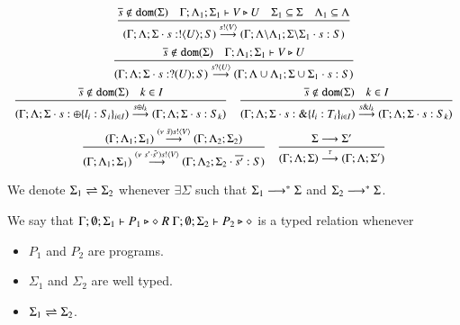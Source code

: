 \[
\begin{array}{c}
	\tree{
		\dual{s} \notin \dom{\Sigma} \quad \Gamma; \Lambda_1; \Sigma_1 \proves V \hastype U \quad \Sigma_1 \subseteq \Sigma \quad \Lambda_1 \subseteq \Lambda
	}{
		(\Gamma; \Lambda; \Sigma \cat s: \btout{U} S) \by{\bactout{s}{V}} (\Gamma; \Lambda\backslash\Lambda_1; \Sigma\backslash\Sigma_1 \cat s: S)
	}
	\\[6mm]
	\tree{
		\dual{s} \notin \dom{\Sigma} \quad  \Gamma; \Lambda_1; \Sigma_1 \proves V \hastype U
	}{
		(\Gamma; \Lambda; \Sigma \cat s: \btinp{U} S) \by{\bactinp{s}{U}} (\Gamma; \Lambda \cup \Lambda_1; \Sigma \cup \Sigma_1 \cat s: S)
	}
	\\[6mm]
	\tree{
		\dual{s} \notin \dom{\Sigma} \quad k \in I
	}{
		(\Gamma; \Lambda; \Sigma \cat s: \btsel{l_i: S_i}_{i \in I}) \by{\bactsel{s}{l_k}} (\Gamma; \Lambda; \Sigma \cat s:S_k)
	}
	\quad
	\tree{
		\dual{s} \notin \dom{\Sigma} \quad k \in I
	}{
		(\Gamma; \Lambda; \Sigma \cat s: \btbra{l_i: T_i}_{i \in I}) \by{\bactbra{s}{l_k}} (\Gamma; \Lambda; \Sigma \cat s:S_k)
	}
	\\[6mm]

	\tree{
		(\Gamma; \Lambda_1; \Sigma_1) \by{\news{\tilde{s}} \bactout{s}{V}} (\Gamma; \Lambda_2; \Sigma_2)
	}{
		(\Gamma; \Lambda_1; \Sigma_1) \by{\news{s' \cat \tilde{s'}} \bactout{s}{V}} (\Gamma; \Lambda_2; \Sigma_2 \cat \dual{s'}: S)
	}
	\quad
	\tree{
		\Sigma \red \Sigma'
	}{
		(\Gamma; \Lambda; \Sigma) \by{\tau} (\Gamma; \Lambda; \Sigma')
	}
\end{array}
\]

\begin{definition}
	We denote $\Sigma_1 \rightleftharpoons \Sigma_2$ whenever $\exists \Sigma$ such that
	$\Sigma_1 \longrightarrow^* \Sigma$ and $\Sigma_2 \longrightarrow^* \Sigma$.
\end{definition}


\begin{definition}
	We say that
	$\Gamma; \emptyset; \Sigma_1 \vdash P_1 \triangleright \diamond\ R\ \Gamma; \emptyset; \Sigma_2 \vdash P_2 \triangleright \diamond$
	is a typed relation whenever
	\begin{itemize}
		\item	$P_1$ and $P_2$ are programs.
		\item	$\Sigma_1$ and $\Sigma_2$ are well typed.
		\item	$\Sigma_1 \rightleftharpoons \Sigma_2$.
	\end{itemize}
\end{definition}

